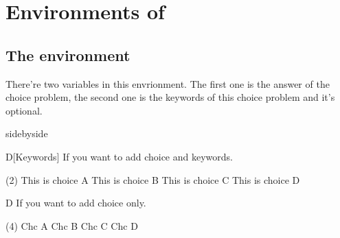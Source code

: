 \section{Environments of }
\subsection{The  environment}
There're two variables in this envrionment. The first one is the answer of the choice problem, the second one is the keywords of this choice problem and it's optional.

\begin{tcblisting}{sidebyside}
\begin{choice}{D}[Keywords]
If you want to add choice and keywords.
\begin{tasks}(2) %
    \task This is choice A  \task This is choice B
    \task This is choice C  \task This is choice D
\end{tasks}
\end{choice}
\begin{choice}{D}
If you want to add choice only.
\begin{tasks}(4) %
    \task Chc A \task Chc B \task Chc C \task Chc D
\end{tasks}
\end{choice}
\end{tcblisting}

